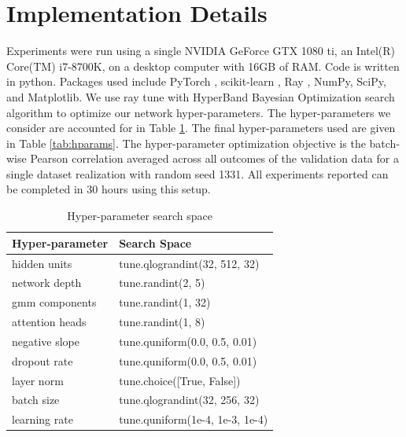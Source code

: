 \section{Implementation Details}
\label{app:implementation}

Experiments were run using a single NVIDIA GeForce GTX 1080 ti, an Intel(R) Core(TM) i7-8700K, on a desktop computer with 16GB of RAM. 
Code is written in python. Packages used include PyTorch \citep{paszke2019pytorch}, scikit-learn \citep{scikit-learn}, Ray \cite{moritz2018ray}, NumPy, SciPy, and Matplotlib. 
We use ray tune \citep{liaw2018tune} with HyperBand Bayesian Optimization \cite{falkner2017combining} search algorithm to optimize our network hyper-parameters. 
The hyper-parameters we consider are accounted for in Table \ref{tab:search_space}. 
The final hyper-parameters used are given in Table \ref{tab:hparams}.
The hyper-parameter optimization objective is the batch-wise Pearson correlation averaged across all outcomes of the validation data for a single dataset realization with random seed 1331.
All experiments reported can be completed in 30 hours using this setup.

\begin{table}[ht]
    \centering
    \begin{tabular}{ll}
        \toprule
        Hyper-parameter & Search Space \\
        \midrule
        hidden units        & tune.qlograndint(32, 512, 32) \\
        network depth       & tune.randint(2, 5) \\
        gmm components      & tune.randint(1, 32) \\
        attention heads     & tune.randint(1, 8) \\
        negative slope      & tune.quniform(0.0, 0.5, 0.01) \\
        dropout rate        & tune.quniform(0.0, 0.5, 0.01) \\
        layer norm          & tune.choice([True, False]) \\
        batch size          & tune.qlograndint(32, 256, 32) \\
        learning rate       & tune.quniform(1e-4, 1e-3, 1e-4) \\
        \bottomrule
    \end{tabular}
    \caption{Hyper-parameter search space}
    \label{tab:search_space}
\end{table}

